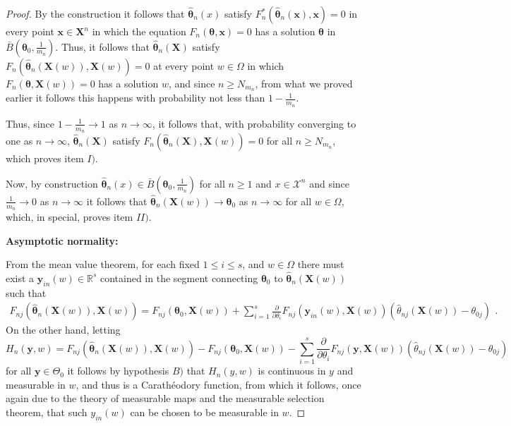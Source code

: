 \documentclass[10pt,a4paper,onecolumn]{article} %
\newcommand{\bs}{\boldsymbol}
\begin{document}
\begin{appendix}
\begin{proof}
By the construction it follows that
$\bs{\hat{\theta}}_n(x)$ satisfy $F^*_n(\bs{\hat{\theta}}_n(\bs{x}),\bs{x})=0$ in every point $\bs{x}\in \bs{X}^n$ in which the equation $F_n(\bs{\theta},\bs{x})=0$ has a solution $\bs{\theta}$ in $\bar{B}\left(\bs{\theta}_0,\frac{1}{m_n}\right)$.
Thus, it follows that $\bs{\hat{\theta}}_n(\bs{X})$ satisfy $F_n(\bs{\hat{\theta}}_n(\bs{X}(w)),\bs{X}(w))=0$ at every point $w\in \Omega$ in which $F_n(\bs{\theta},\bs{X}(w))=0$ has a solution $w$, and since $n\geq N_{m_n}$, from what we proved earlier it follows this happens with probability not less than $1-\frac{1}{m_n}$. 

Thus, since $1-\frac{1}{m_n}\to 1$ as $n\to \infty$, it follows that, with probability converging to one as $n\to \infty$, $\hat{\bs{\theta}}_n(\bs{X})$ satisfy $F_n\left(\bs{\hat{\theta}}_n(\bs{X}),\bs{X}(w)\right)=0$ for all $n\geq N_{m_n}$, which proves item $I)$.

Now, by construction $\bs{\hat{\theta}}_n(x)\in \bar{B}\left(\bs{\theta}_0,\frac{1}{m_n}\right)$ for all $n\geq 1$ and $x\in \mathcal{X}^n$ and since $\frac{1}{m_n}\to 0$ as $n\to \infty$ it follows that $\bs{\hat{\theta}}_n(\bs{X}(w)) \to \bs{\theta}_0$ as $n\to \infty$ for all $w\in \Omega$, which, in special, proves item $II)$.

\noindent\textbf{Asymptotic normality:}
\vspace{0.3cm}

From the mean value theorem, for each fixed $1\leq i\leq s$, and $w\in \Omega$ there must exist a $\bs{y}_{in}(w) \in \mathbb{R}^s$ contained in the segment connecting $\bs{\theta}_0$ to $\bs{\hat{\theta}}_n(\bs{X}(w))$ such that
\begin{equation}\label{eqF_n}
\begin{aligned}
F_{nj}(\bs{\hat{\theta}}_n(\bs{X}(w)),\bs{X}(w)) = F_{nj}(\bs{\theta}_0,\bs{X}(w)) + \sum_{i=1}^s  \frac{\partial}{\partial \theta_i} F_{nj}(\bs{y}_{in}(w),\bs{X}(w)) (\hat{\theta}_{nj}(\bs{X}(w)) - \theta_{0j})
\end{aligned}.
\end{equation}
On the other hand, letting
\begin{equation*}H_n(\bs{y},w) = F_{nj}(\bs{\hat{\theta}}_n(\bs{X}(w)),\bs{X}(w)) - F_{nj}(\bs{\theta}_0,\bs{X}(w)) - \sum_{i=1}^s  \frac{\partial}{\partial \theta_i} F_{nj}(\bs{y},\bs{X}(w)) (\hat{\theta}_{nj}(\bs{X}(w)) - \theta_{0j})
\end{equation*}
for all $\bs{y}\in \Theta_0$
it follows by hypothesis $B)$ that $H_n(y,w)$ is continuous in $y$ and measurable in $w$, and thus is a Carathéodory function,
from which it follows, once again due to the theory of measurable maps and the measurable selection theorem, that such $y_{in}(w)$ can be chosen to be measurable in $w$.


\end{proof}
\end{appendix}
\end{document}
